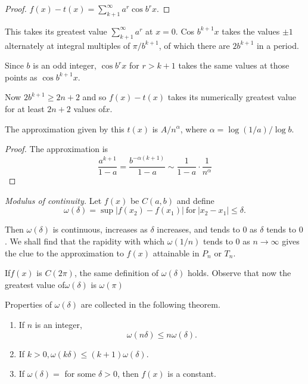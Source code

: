 \begin{proof}
  $f(x)-t(x)=\sum^\infty_{k+1}a^r \cos b^r x$.
\end{proof}

This takes its greatest value $\sum \limits^ \infty _{k+1}a^r$ at
$x=0$. Cos $b^{k+1}x$ takes the values $\pm 1$ alternately at integral
multiples of $\pi/b^{k+1}$, of which there are $2b^{k+1}$ in a
period. 

Since $b$ is an odd integer, $\cos b^r x$ for $r>k+1$ takes the same
values at those points as $\cos b^{k+1}x$. 

Now $2b^{k+1}\geq 2n+2$ and so $f(x)-t(x)$ takes its numerically
greatest value for at least $2n+2$ values of$x$. 

\begin{coro*}\label{page33}
  The approximation given by this $t(x)$ is $A/n^ \alpha$, where
  $\alpha =\log (1/a)/ \log	 b$. 
\end{coro*}

\begin{proof}
  The approximation is 
  $$
  \frac{a^{k+1}}{1-a}=\frac{b^{-\alpha(k+1)}}{1-a}\sim
  \frac{1}{1-a}\cdot\frac{1}{n^ \alpha}  
  $$
\end{proof}

\noindent
\textit{Modulus of continuity.} Let $f(x)$ be $C(a,b)$ and define
$$
\omega (\delta)=\sup |f(x_2)-f(x_1)| ~\text{for}~ |x_2-x_1|\leq \delta.
$$

Then $\omega(\delta)$ is continuous, increases as $\delta$ increases,
and tends to $0$ as $\delta$ tends to $0$. We shall find that the
rapidity with which $\omega(1/n)$ tends to $0$ as $n \to \infty$ gives
the clue to the approximation to $f(x)$ attainable in $P_n$ or $T_n$. 

If\pageoriginale $f(x)$ is $C(2 \pi)$, the same definition of $\omega (\delta)$
holds. Observe that now the greatest value of$\omega (\delta)$ is
$\omega (\pi)$  

Properties of $\omega (\delta)$ are collected in the following
theorem.

\begin{theorem}\label{chap4:sec10:thm16}%
  \begin{enumerate}[(1)]
  \item If $n$ is an integer,
    $$
    \omega(n \delta) \leq n \omega (\delta).
    $$
  \item If $k>0, \omega (k \delta) \leq (k+1) \omega(\delta)$.
  \item If $\omega(\delta)=$ for some $\delta > 0$, then $f(x)$ is a constant.
  \end{enumerate}
\end{theorem}


